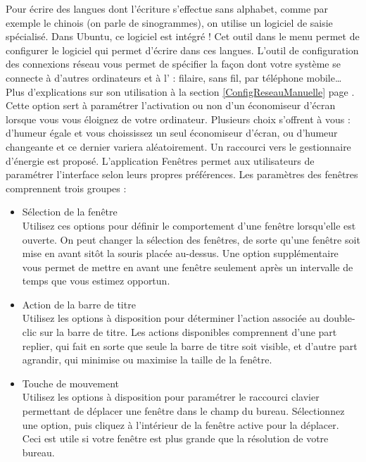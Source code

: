 Pour écrire des langues dont l'écriture s'effectue sans alphabet, comme par exemple le chinois (on parle de sinogrammes), on utilise un logiciel de saisie spécialisé. Dans Ubuntu, ce logiciel est intégré ! Cet outil dans le menu permet de configurer le logiciel qui permet d'écrire dans ces langues.
L'outil de configuration des connexions réseau vous permet de spécifier la façon dont votre système se connecte à d'autres ordinateurs et à l' : filaire, sans fil, par téléphone mobile\ldots{} Plus d'explications sur son utilisation à la section \ref{ConfigReseauManuelle} page \pageref{ConfigReseauManuelle}.
Cette option sert à paramétrer l'activation ou non d'un économiseur d'écran lorsque vous vous éloignez de votre ordinateur. Plusieurs choix s'offrent à vous : d'humeur égale et vous choississez un seul économiseur d’écran, ou d'humeur changeante et ce dernier variera aléatoirement. Un raccourci vers le gestionnaire d'énergie est proposé.
L'application Fenêtres permet aux utilisateurs de paramétrer l'interface selon leurs propres préférences. Les paramètres des fenêtres comprennent trois groupes : 
\begin{itemize}
\item Sélection de la fenêtre\\
Utilisez ces options pour définir le comportement d'une fenêtre lorsqu'elle est ouverte. On peut changer la sélection des fenêtres, de sorte qu'une fenêtre soit mise en avant sitôt la souris placée au-dessus. Une option supplémentaire vous permet de mettre en avant une fenêtre seulement après un intervalle de temps que vous estimez opportun. 
\item Action de la barre de titre\\
Utilisez les options à disposition pour déterminer l'action associée au double-clic sur la barre de titre. Les actions disponibles comprennent d'une part replier, qui fait en sorte que seule la barre de titre soit visible, et d'autre part agrandir, qui minimise ou maximise la taille de la fenêtre. 
\item Touche de mouvement\\
Utilisez les options à disposition pour paramétrer le raccourci clavier permettant de déplacer une fenêtre dans le champ du bureau. Sélectionnez une option, puis cliquez à l'intérieur de la fenêtre active pour la déplacer. Ceci est utile si votre fenêtre est plus grande que la résolution de votre bureau. 
\end{itemize}
